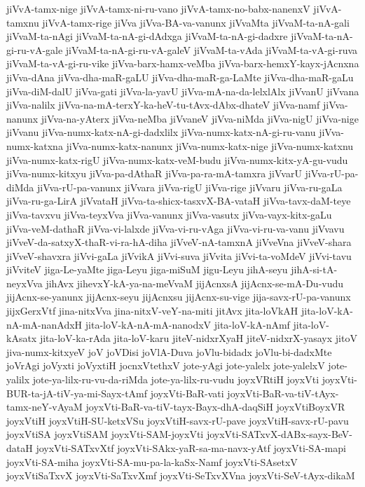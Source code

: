 {jiVvA-tamx-nige
jiVvA-tamx-ni-ru-vano
jiVvA-tamx-no-babx-nanenxV
jiVvA-tamxnu
jiVvA-tamx-rige
jiVva
jiVva-BA-va-vanunx
jiVvaMta
jiVvaM-ta-nA-gali
jiVvaM-ta-nAgi
jiVvaM-ta-nA-gi-dAdxga
jiVvaM-ta-nA-gi-dadxre
jiVvaM-ta-nA-gi-ru-vA-gale
jiVvaM-ta-nA-gi-ru-vA-galeV
jiVvaM-ta-vAda
jiVvaM-ta-vA-gi-ruva
jiVvaM-ta-vA-gi-ru-vike
jiVva-barx-hamx-veMba
jiVva-barx-hemxY-kayx-jAcnxna
jiVva-dAna
jiVva-dha-maR-gaLU
jiVva-dha-maR-ga-LaMte
jiVva-dha-maR-gaLu
jiVva-diM-dalU
jiVva-gati
jiVva-la-yavU
jiVva-mA-na-da-lelxlAlx
jiVvanU
jiVvana
jiVva-nalilx
jiVva-na-mA-terxY-ka-heV-tu-tAvx-dAbx-dhateV
jiVva-namf
jiVva-nanunx
jiVva-na-yAterx
jiVva-neMba
jiVvaneV
jiVva-niMda
jiVva-nigU
jiVva-nige
jiVvanu
jiVva-numx-katx-nA-gi-dadxlilx
jiVva-numx-katx-nA-gi-ru-vanu
jiVva-numx-katxna
jiVva-numx-katx-nanunx
jiVva-numx-katx-nige
jiVva-numx-katxnu
jiVva-numx-katx-rigU
jiVva-numx-katx-veM-budu
jiVva-numx-kitx-yA-gu-vudu
jiVva-numx-kitxyu
jiVva-pa-dAthaR
jiVva-pa-ra-mA-tamxra
jiVvarU
jiVva-rU-pa-diMda
jiVva-rU-pa-vanunx
jiVvara
jiVva-rigU
jiVva-rige
jiVvaru
jiVva-ru-gaLa
jiVva-ru-ga-LirA
jiVvataH
jiVva-ta-shicx-tasxvX-BA-vataH
jiVva-tavx-daM-teye
jiVva-tavxvu
jiVva-teyxVva
jiVva-vanunx
jiVva-vasutx
jiVva-vayx-kitx-gaLu
jiVva-veM-dathaR
jiVva-vi-lalxde
jiVva-vi-ru-vAga
jiVva-vi-ru-va-vanu
jiVvavu
jiVveV-da-satxyX-thaR-vi-ra-hA-diha
jiVveV-nA-tamxnA
jiVveVna
jiVveV-shara
jiVveV-shavxra
jiVvi-gaLa
jiVvikA
jiVvi-suva
jiVvita
jiVvi-ta-voMdeV
jiVvi-tavu
jiVviteV
jiga-Le-yaMte
jiga-Leyu
jiga-miSuM
jigu-Leyu
jihA-seyu
jihA-si-tA-neyxVva
jihAvx
jihevxY-kA-ya-na-meVvaM
jijAcnxsA
jijAcnx-se-mA-Du-vudu
jijAcnx-se-yanunx
jijAcnx-seyu
jijAcnxsu
jijAcnx-su-vige
jija-savx-rU-pa-vanunx
jijxGerxVtf
jina-nitxVva
jina-nitxV-veY-na-miti
jitAvx
jita-loVkAH
jita-loV-kA-nA-mA-nanAdxH
jita-loV-kA-nA-mA-nanodxV
jita-loV-kA-nAmf
jita-loV-kAsatx
jita-loV-ka-rAda
jita-loV-karu
jiteV-nidxrXyaH
jiteV-nidxrX-yasayx
jitoV
jiva-numx-kitxyeV
joV
joVDisi
joVlA-Duva
joVlu-bidadx
joVlu-bi-dadxMte
joVrAgi
joVyxti
joVyxtiH
jocnxVtethxV
jote-yAgi
jote-yalelx
jote-yalelxV
jote-yalilx
jote-ya-lilx-ru-vu-da-riMda
jote-ya-lilx-ru-vudu
joyxVRtiH
joyxVti
joyxVti-BUR-ta-jA-tiV-ya-mi-Sayx-tAmf
joyxVti-BaR-vati
joyxVti-BaR-va-tiV-tAyx-tamx-neY-vAyaM
joyxVti-BaR-va-tiV-tayx-Bayx-dhA-daqSiH
joyxVtiBoyxVR
joyxVtiH
joyxVtiH-SU-ketxVSu
joyxVtiH-savx-rU-pave
joyxVtiH-savx-rU-pavu
joyxVtiSA
joyxVtiSAM
joyxVti-SAM-joyxVti
joyxVti-SATxvX-dABx-sayx-BeV-dataH
joyxVti-SATxvXtf
joyxVti-SAkx-yaR-sa-ma-navx-yAtf
joyxVti-SA-mapi
joyxVti-SA-miha
joyxVti-SA-mu-pa-la-kaSx-Namf
joyxVti-SAsetxV
joyxVtiSaTxvX
joyxVti-SaTxvXmf
joyxVti-SeTxvXVna
joyxVti-SeV-tAyx-dikaM
}
